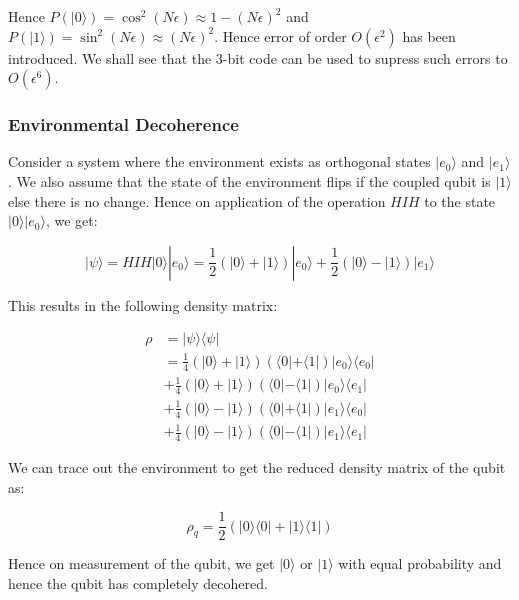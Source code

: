 \documentclass[conference]{IEEEtran}
\begin{document}
Hence $P(|0\rangle) = \cos^2(N \epsilon) \approx 1 - (N \epsilon)^2$ and $P(|1\rangle) = \sin^2(N \epsilon) \approx (N \epsilon)^2$. Hence error of order $O(\epsilon^2)$ has been introduced. We shall see that the 3-bit code can be used to supress such errors to $O(\epsilon^6)$.

\vspace{4pt}
\subsubsection{Environmental Decoherence}
Consider a system where the environment exists as orthogonal states $|e_0\rangle$ and $|e_1\rangle$. We also assume that the state of the environment flips if the coupled qubit is $|1\rangle$ else there is no change. Hence on application of the operation $HIH$ to the state $|0\rangle |e_0\rangle$, we get:

\begin{equation}
    | \psi \rangle = HIH |0\rangle |e_0\rangle = \frac{1}{2} (|0\rangle + |1\rangle) |e_0\rangle + \frac{1}{2} (|0\rangle - |1\rangle) |e_1\rangle
\end{equation}

This results in the following density matrix:

\begin{equation}
    \begin{aligned}
        \rho &= |\psi\rangle \langle \psi| \\
        &= \frac{1}{4} (|0\rangle + |1\rangle)(\langle 0| + \langle 1|) |e_0\rangle \langle e_0| \\
        &+ \frac{1}{4} (|0\rangle + |1\rangle)(\langle 0| - \langle 1|) |e_0\rangle \langle e_1| \\
        &+ \frac{1}{4} (|0\rangle - |1\rangle)(\langle 0| + \langle 1|) |e_1\rangle \langle e_0| \\
        &+ \frac{1}{4} (|0\rangle - |1\rangle)(\langle 0| - \langle 1|) |e_1\rangle \langle e_1|
    \end{aligned}
\end{equation}

We can trace out the environment to get the reduced density matrix of the qubit as:

\begin{equation}
    \rho_q = \frac{1}{2} (|0\rangle \langle 0| + |1\rangle \langle 1|)
\end{equation}

Hence on measurement of the qubit, we get $|0\rangle$ or $|1\rangle$ with equal probability and hence the qubit has completely decohered.
\end{document}
